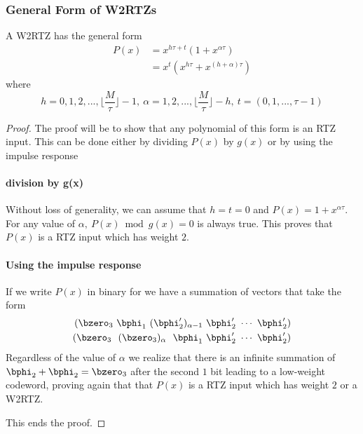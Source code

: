\subsubsection{General Form of W2RTZs}
A W2RTZ has the general form
\begin{equation}
\begin{split}
P(x)&=x^{h\tau+t}(1+x^{\alpha \tau})\\
& = x^t(x^{h\tau}+x^{(h+\alpha)\tau})
\end{split}
\end{equation}
where
$$h=0,1,2,...,\Big\lfloor \frac{M}{\tau} \Big\rfloor-1,~
 \alpha=1,2,...,\Big\lfloor \frac{M}{\tau} \Big\rfloor-h,~
 t=(0,1,...,\tau-1)$$

\begin{proof}
The proof will be to show that any polynomial of this form is an RTZ input. This can be done either by dividing $P(x)$ by $g(x)$ or by using the impulse response
\paragraph{division by g(x)}
Without loss of generality, we can assume that $h=t=0$ and $P(x) = 1+x^{\alpha \tau}$.
For any value of $\alpha,~P(x) \bmod g(x) = 0$ is always true. This proves that $P(x)$ is a RTZ input which has weight $2$.

\paragraph{Using the impulse response}
If we write $P(x)$ in binary for we have a summation of vectors that take the form
\begin{eqnarray*}
(\bzero_3~\bphi_1~(\bphi'_2)_{\alpha-1}~\bphi'_2~\cdots~\bphi'_2)\cr
(\bzero_3~~(\bzero_3)_{\alpha}~~\bphi_1~\bphi'_2~\cdots~\bphi'_2)
\end{eqnarray*}
Regardless of the value of $\alpha$ we realize that there is an infinite summation of $\bphi_2+\bphi_2=\bzero_3$ after the second $1$ bit leading to a low-weight codeword, proving again that that $P(x)$ is a RTZ input which has weight $2$ or a W2RTZ.

This ends the proof.
\end{proof}


